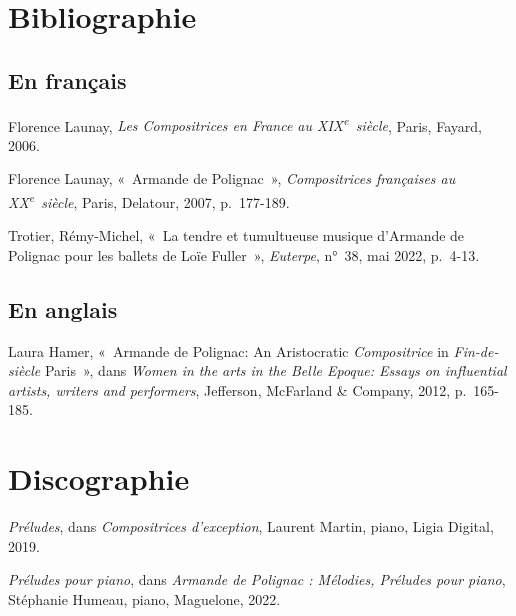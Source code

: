\documentclass[a4paper, 12pt]{book}
\begin{document}
\section*{Bibliographie}

\subsection*{En français}

\begin{hangparas}{.5cm}{1}

  Florence Launay, \emph{Les Compositrices en France au
  XIX\textsuperscript{e}~siècle}, Paris, Fayard, 2006.
  
  Florence Launay, «~Armande de Polignac~», \emph{Compositrices
  françaises au XX\textsuperscript{e}~siècle}, Paris, Delatour, 2007,
  p.~177-189.

  Trotier, Rémy-Michel, «~La tendre et tumultueuse musique
  d'Armande de Polignac pour les ballets de Loïe Fuller~», \emph{Euterpe},
  n°~38, mai 2022, p.~4-13.
  
\end{hangparas}

\vspace{\baselineskip}

\subsection*{En anglais}

\begin{hangparas}{.5cm}{1}
  
  Laura Hamer, «~Armande de Polignac: An Aristocratic
  \emph{Compositrice} in \emph{Fin-de-siècle} Paris~», dans
  \emph{Women in the arts in the Belle Epoque: Essays on influential
  artists, writers and performers}, Jefferson, McFarland \& Company,
  2012, p.~165-185.
  
\end{hangparas}

\vspace{\baselineskip}

\section*{Discographie}

\begin{hangparas}{.5cm}{1}
  
  \emph{Préludes}, dans \emph{Compositrices d'exception}, Laurent
  Martin, piano, Ligia Digital, 2019.

  \emph{Préludes pour piano}, dans \emph{Armande de Polignac : Mélodies, Préludes pour piano},
  Stéphanie Humeau, piano, Maguelone, 2022.

\end{hangparas}
\end{document}
